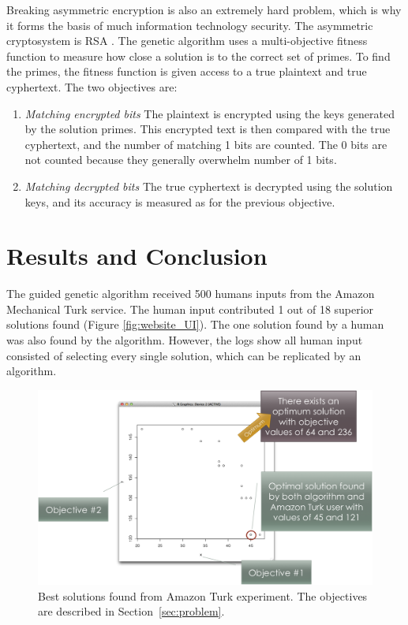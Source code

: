 Breaking asymmetric encryption is also an extremely hard problem, which is why it forms the basis of much information technology security.  The asymmetric cryptosystem is RSA \citep{cormen01:_introd_to_algor}.  The genetic algorithm uses a multi-objective fitness function to measure how close a solution is to the correct set of primes.  To find the primes, the fitness function is given access to a true plaintext and true cyphertext. The two objectives are:

\begin{enumerate}
\item \emph{Matching encrypted bits} The plaintext is encrypted using the keys generated by the solution primes.  This encrypted text is then compared with the true cyphertext, and the number of matching 1 bits are counted.  The 0 bits are not counted because they generally overwhelm number of 1 bits.

\item \emph{Matching decrypted bits} The true cyphertext is decrypted using the solution keys, and its accuracy is measured as for the previous objective.
\end{enumerate}

\section{Results and Conclusion}
The guided genetic algorithm received 500 humans inputs from the Amazon Mechanical Turk service.  The human input contributed 1 out of 18 superior solutions found (Figure \ref{fig:website_UI}).  The one solution found by a human was also found by the algorithm.  However, the logs show all human input consisted of selecting every single solution, which can be replicated by an algorithm.

\begin{figure}[!t]
  \centering
  \includegraphics[width=4.5in]{HollowayResults}
  \caption{Best solutions found from Amazon Turk experiment.  The objectives are described in Section~\ref{sec:problem}.}
  \label{fig:results}
\end{figure}

